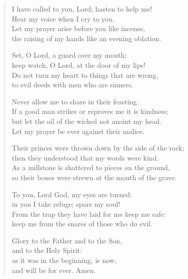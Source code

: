 \begin{verse}
I have called to you, Lord; hasten to help me!\\
    Hear my voice when I cry to you.\\
Let my prayer arise before you like incense,\\
    the raising of my hands like an evening oblation.

Set, O Lord, a guard over my mouth;\\
    keep watch, O Lord, at the door of my lips!\\
Do not turn my heart to things that are wrong,\\
    to evil deeds with men who are sinners.

Never allow me to share in their feasting.\\
    If a good man strikes or reproves me it is kindness;\\
but let the oil of the wicked not anoint my head.\\
    Let my prayer be ever against their malice.

Their princes were thrown down by the side of the rock;\\
    then they understood that my words were kind.\\
As a millstone is shattered to pieces on the ground,\\
    so their bones were strewn at the mouth of the grave.

To you, Lord God, my eyes are turned:\\
    in you I take refuge; spare my soul!\\
From the trap they have laid for me keep me safe:\\
    keep me from the snares of those who do evil.

Glory to the Father and to the Son,\\
    and to the Holy Spirit:\\
as it was in the beginning, is now,\\
    and will be for ever. Amen.
\end{verse}
